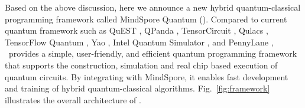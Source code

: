 Based on the above discussion, here we announce a new hybrid quantum-classical programming framework called MindSpore Quantum (\MindQuantum). Compared to current quantum framework such as QuEST \cite{jones2019quest}, QPanda \cite{dou2022qpanda}, TensorCircuit \cite{zhang2023tensorcircuit}, Qulacs \cite{suzuki2021qulacs}, TensorFlow Quantum \cite{broughton2020tensorflow}, Yao \cite{luo2020yao}, Intel Quantum Simulator \cite{guerreschi2020intel}, and PennyLane \cite{bergholm2018pennylane}, \MindQuantum\ provides a simple, user-friendly, and efficient quantum programming framework that supports the construction, simulation and real chip based execution of quantum circuits. By integrating with MindSpore, it enables fast development and training of hybrid quantum-classical algorithms. Fig.~\ref{fig:framework} illustrates the overall architecture of \MindQuantum.

